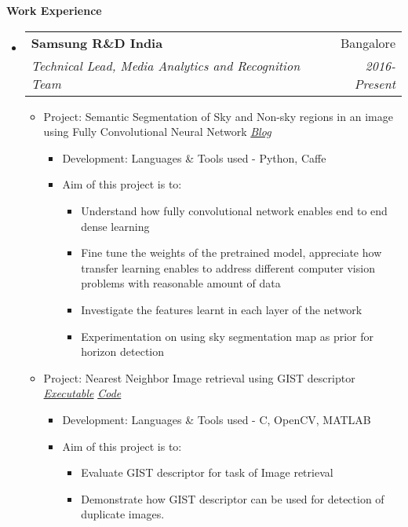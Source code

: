 \documentclass[letterpaper,11pt]{article}
\makeatletter
\def\CC{{C\nolinebreak[4]\hspace{-.05em}\raisebox{.4ex}{\tiny\bf ++}}}
\newcommand{\resitem}[1]{\item #1 \vspace{-2pt}}
\newcommand{\resheading}[1]{{\large \colorbox{mygrey}{\begin{minipage}{\textwidth}{\textbf{#1 \vphantom{p\^{E}}}}\end{minipage}}}}
\newcommand{\ressubheading}[4]{
	\begin{tabular*}{7.0in}{l@{\extracolsep{\fill}}r}
		\textbf{#1} & #2 \\
		\textit{#3} & \textit{#4} \\
	\end{tabular*}\vspace{-6pt}}
\makeatother
\begin{document}
\resheading{Work Experience}
\begin{itemize}
	\item
		\ressubheading{Samsung R\&D India}{Bangalore}{Technical Lead, Media Analytics and Recognition Team}{2016-Present}
		\vspace{1mm}
		\begin{itemize}
				\resitem[]{\faCircleO
					\hspace{1mm}Project: Semantic Segmentation of Sky and Non-sky regions in an image using Fully Convolutional Neural Network
					\faGlobe \hspace{1mm} \href{https://nrupatunga.github.io/fcn-segmentation/}{\emph{Blog}}}
				\begin{itemize}
						\resitem{Development: Languages \& Tools used - Python, Caffe}
				\end{itemize}
				\begin{itemize}
						\resitem{Aim of this project is to:}
						\begin{itemize}
								\resitem{Understand how fully convolutional network enables end to end dense learning}
								\resitem{Fine tune the weights of the pretrained model, appreciate how transfer learning enables 
									to address different computer vision problems with reasonable amount of data}
								\resitem{Investigate the features learnt in each layer of the network}
								\resitem{Experimentation on using sky segmentation map as prior for horizon detection}
						\end{itemize}
				\end{itemize}
				\vspace{1mm}
				\resitem[]{\faCircleO \hspace{1mm}Project: Nearest Neighbor Image retrieval using GIST descriptor
					\faWrench \hspace{1mm} \href{https://github.com/nrupatunga/GIST-global-Image-Descripor}{\emph{Executable}}
					\faGithub \hspace{1mm} \href{https://github.com/nrupatunga/GIST-global-Image-Descripor}{\emph{Code}}}
				\begin{itemize}
						\resitem{Development: Languages \& Tools used - \CC, OpenCV, MATLAB}
				\end{itemize}
				\begin{itemize}
						\resitem{Aim of this project is to:}
						\begin{itemize}
								\resitem{Evaluate GIST descriptor for task of Image retrieval}
								\resitem{Demonstrate how GIST descriptor can be used for detection of duplicate images. 
}
\end{itemize}
\end{itemize}
\end{itemize}
\end{itemize}
\end{document}
